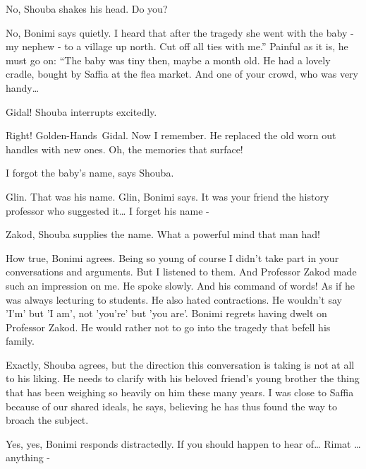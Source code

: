 \documentclass[twoside,11pt]{book}
\begin{document}
{\textquotedbl}No,{\textquotedbl} Shouba shakes his head. {\textquotedbl}Do you?{\textquotedbl} 

{\textquotedbl}No,{\textquotedbl} Bonimi says quietly. {\textquotedbl}I heard that after the tragedy she went with the
baby - my nephew - to a village up north. Cut off all ties with me.'' Painful as it is, he must go on: ``The baby was
tiny then, maybe a month old. He had a lovely cradle, bought by Saffia at the flea market. And one of your crowd, who
was very handy{\dots}{\textquotedbl}

{\textquotedbl}Gidal!{\textquotedbl} Shouba interrupts excitedly.

{\textquotedbl}Right! Golden-Hands\ Gidal. Now I remember. He replaced the old worn out handles with new ones. Oh, the
memories that surface!{\textquotedbl}

{\textquotedbl}I forgot the baby's name,{\textquotedbl} says Shouba.

{\textquotedbl}Glin. That was his name. Glin,{\textquotedbl} Bonimi says. {\textquotedbl}It was your friend the history
professor who suggested it{\dots} I forget his name -{\textquotedbl}

{\textquotedbl}Zakod,{\textquotedbl} Shouba supplies the name. {\textquotedbl}What a powerful mind that man
had!{\textquotedbl}

{\textquotedbl}How true,{\textquotedbl} Bonimi agrees. {\textquotedbl}Being so young of course I didn't take part in
your conversations and arguments. But I listened to them. And Professor Zakod made such an impression on me. He spoke
slowly. And his command of words! As if he was always lecturing to students. He also hated contractions. He wouldn't
say 'I'm' but 'I am', not 'you're' but 'you are'.{\textquotedbl} Bonimi regrets having dwelt on Professor Zakod. He
would rather not to go into the tragedy that befell his family.

{\textquotedbl}Exactly,{\textquotedbl} Shouba agrees, but the direction this conversation is taking is not at all to his
liking. He needs to clarify with his beloved friend's young brother the thing that has been weighing so heavily on him
these many years. {\textquotedbl}I was close to Saffia because of our shared ideals,{\textquotedbl} he says, believing
he has thus found the way to broach the subject. 

{\textquotedbl}Yes, yes,{\textquotedbl} Bonimi responds distractedly. {\textquotedbl}If you should happen to hear
of{\dots} Rimat {\dots} anything -{\textquotedbl}\ 
\end{document}

